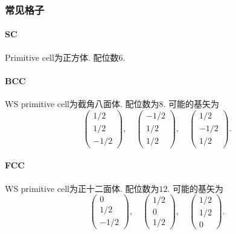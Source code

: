 \documentclass[hidelinks]{ctexart}
\begin{document}

\subsubsection{常见格子} %
\label{ssub:常见格子}

\paragraph{SC} %
\label{par:sc}

Primitive cell为正方体. 配位数$6$.


\paragraph{BCC} %
\label{par:bcc}

WS primitive cell为截角八面体. 配位数为$8$. 可能的基矢为
\[ \begin{pmatrix}
    1/2 \\ 1/2 \\ -1/2
\end{pmatrix},\quad \begin{pmatrix}
    -1/2 \\ 1/2 \\ 1/2
\end{pmatrix},\quad \begin{pmatrix}
    1/2 \\ -1/2 \\ 1/2
\end{pmatrix}. \]


\paragraph{FCC} %
\label{par:fcc}

WS primitive cell为正十二面体. 配位数为$12$. 可能的基矢为
\[ \begin{pmatrix}
    0 \\ 1/2 \\ -1/2
\end{pmatrix},\quad \begin{pmatrix}
    1/2 \\ 0 \\ 1/2
\end{pmatrix},\quad \begin{pmatrix}
    1/2 \\ 1/2 \\ 0
\end{pmatrix}. \]
\end{document}
